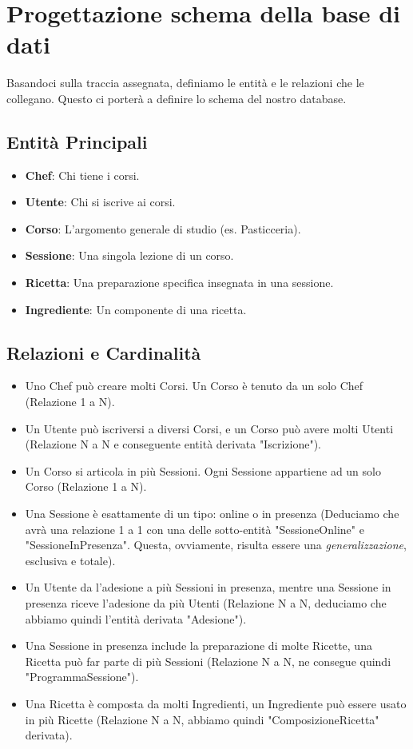 \documentclass[a4paper, 12pt]{article}
\begin{document}
\newpage

\section{Progettazione schema della base di dati}
    Basandoci sulla traccia assegnata, definiamo le entità e le relazioni che le collegano. Questo ci porterà a definire lo schema del nostro database.

    \subsection{Entità Principali}
    \begin{itemize}
        \item \textbf{Chef}: Chi tiene i corsi.
        \item \textbf{Utente}: Chi si iscrive ai corsi.
        \item \textbf{Corso}: L'argomento generale di studio (es. Pasticceria).
        \item \textbf{Sessione}: Una singola lezione di un corso.
        \item \textbf{Ricetta}: Una preparazione specifica insegnata in una sessione.
        \item \textbf{Ingrediente}: Un componente di una ricetta.
    \end{itemize}

    \subsection{Relazioni e Cardinalità}
    \begin{itemize}
        \item Uno Chef può creare molti Corsi. Un Corso è tenuto da un solo Chef (Relazione 1 a N).
        \item Un Utente può iscriversi a diversi Corsi, e un Corso può avere molti Utenti (Relazione N a N e conseguente entità derivata "Iscrizione").
        \item Un Corso si articola in più Sessioni. Ogni Sessione appartiene ad un solo Corso (Relazione 1 a N).
        \item Una Sessione è esattamente di un tipo: online o in presenza (Deduciamo che avrà una relazione 1 a 1 con una delle sotto-entità "SessioneOnline" e "SessioneInPresenza". Questa, ovviamente, risulta essere una \textit{generalizzazione}, esclusiva e totale).
        \item Un Utente da l'adesione a più Sessioni in presenza, mentre una Sessione in presenza riceve l'adesione da più Utenti (Relazione N a N, deduciamo che abbiamo quindi l'entità derivata "Adesione").
        \item Una Sessione in presenza include la preparazione di molte Ricette, una Ricetta può far parte di più Sessioni (Relazione N a N, ne consegue quindi "ProgrammaSessione").
        \item Una Ricetta è composta da molti Ingredienti, un Ingrediente può essere usato in più Ricette (Relazione N a N, abbiamo quindi "ComposizioneRicetta" derivata).
    \end{itemize}
\end{document}
